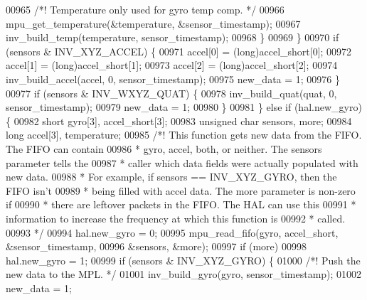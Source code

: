 \begin{DoxyCode}
{{{{{{{{00965                     \textcolor{comment}{/*! Temperature only used for gyro temp comp. */}
00966                     mpu\_get\_temperature(&temperature, &sensor\_timestamp);
00967                     inv\_build\_temp(temperature, sensor\_timestamp);
00968                 \}
00969             \}
00970             \textcolor{keywordflow}{if} (sensors & INV\_XYZ\_ACCEL) \{
00971                 accel[0] = (\textcolor{keywordtype}{long})accel\_short[0];
00972                 accel[1] = (\textcolor{keywordtype}{long})accel\_short[1];
00973                 accel[2] = (\textcolor{keywordtype}{long})accel\_short[2];
00974                 inv\_build\_accel(accel, 0, sensor\_timestamp);
00975                 new\_data = 1;
00976             \}
00977             \textcolor{keywordflow}{if} (sensors & INV\_WXYZ\_QUAT) \{
00978                 inv\_build\_quat(quat, 0, sensor\_timestamp);
00979                 new\_data = 1;
00980             \}
00981         \} \textcolor{keywordflow}{else} \textcolor{keywordflow}{if} (hal.new_gyro) \{
00982             \textcolor{keywordtype}{short} gyro[3], accel\_short[3];
00983             \textcolor{keywordtype}{unsigned} \textcolor{keywordtype}{char} sensors, more;
00984             \textcolor{keywordtype}{long} accel[3], temperature;
00985             \textcolor{comment}{/*! This function gets new data from the FIFO. The FIFO can contain}
00986 \textcolor{comment}{             * gyro, accel, both, or neither. The sensors parameter tells the}
00987 \textcolor{comment}{             * caller which data fields were actually populated with new data.}
00988 \textcolor{comment}{             * For example, if sensors == INV\_XYZ\_GYRO, then the FIFO isn't}
00989 \textcolor{comment}{             * being filled with accel data. The more parameter is non-zero if}
00990 \textcolor{comment}{             * there are leftover packets in the FIFO. The HAL can use this}
00991 \textcolor{comment}{             * information to increase the frequency at which this function is}
00992 \textcolor{comment}{             * called.}
00993 \textcolor{comment}{             */}
00994             hal.new_gyro = 0;
00995             mpu\_read\_fifo(gyro, accel\_short, &sensor\_timestamp,
00996                 &sensors, &more);
00997             \textcolor{keywordflow}{if} (more)
00998                 hal.new_gyro = 1;
00999             \textcolor{keywordflow}{if} (sensors & INV\_XYZ\_GYRO) \{
01000                 \textcolor{comment}{/*! Push the new data to the MPL. */}
01001                 inv\_build\_gyro(gyro, sensor\_timestamp);
01002                 new\_data = 1;
}}}}}}}}
\end{DoxyCode}
